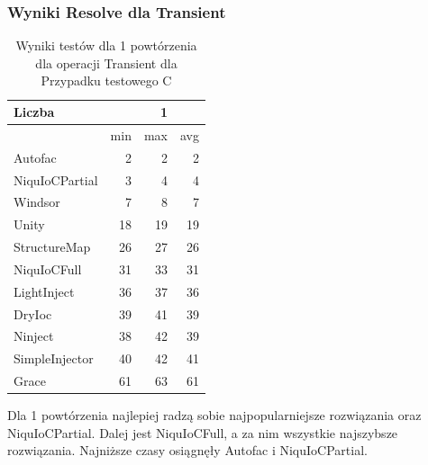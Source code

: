 \documentclass[12pt]{article}
\begin{document}
\subsubsection{Wyniki Resolve dla Transient}
\begin{table}[H]
\captionsetup{belowskip=0pt,aboveskip=0pt}
\begin{center}
\begin{small}
	\begin{tabular}{ | l | r r r | }
    		\hline
Liczba & & 1 & \\ \hline
 & min & max & avg \\ \hline
Autofac & 2 & 2 & 2 \\ \hline
NiquIoCPartial & 3 & 4 & 4 \\ \hline
Windsor & 7 & 8 & 7 \\ \hline
Unity & 18 & 19 & 19 \\ \hline
StructureMap & 26 & 27 & 26 \\ \hline
NiquIoCFull & 31 & 33 & 31 \\ \hline
LightInject & 36 & 37 & 36 \\ \hline
DryIoc & 39 & 41 & 39 \\ \hline
Ninject & 38 & 42 & 39 \\ \hline
SimpleInjector & 40 & 42 & 41 \\ \hline
Grace & 61 & 63 & 61 \\ \hline
  	\end{tabular}
\end{small}
\end{center}
\caption{Wyniki testów dla 1 powtórzenia dla operacji Transient dla Przypadku testowego C}
\label{TestCaseC_Transient1}
\end{table}
Dla 1 powtórzenia najlepiej radzą sobie najpopularniejsze rozwiązania oraz NiquIoCPartial. Dalej jest NiquIoCFull, a za nim wszystkie najszybsze rozwiązania. Najniższe czasy osiągnęły Autofac i NiquIoCPartial.
\\ \\
\end{document}
